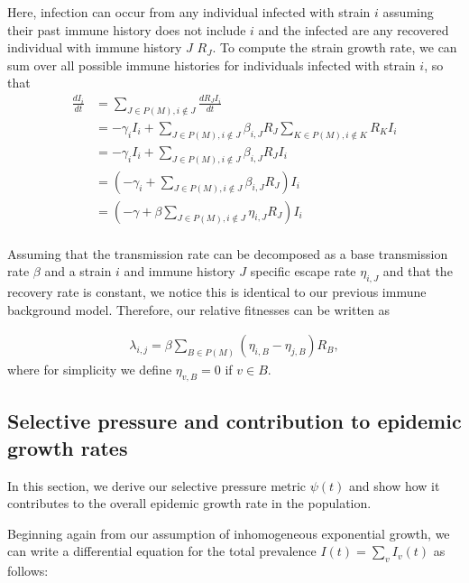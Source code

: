 \documentclass[11pt,oneside,letterpaper]{article}
\newcommand{\varEscape}{\eta}
\begin{document}
Here, infection can occur from any individual infected with strain $i$ assuming their past immune history does not include $i$ and the infected are any recovered individual with immune history $J$  $R_{J}$.
To compute the strain growth rate, we can sum over all possible immune histories for individuals infected with strain $i$, so that
\begin{align*}
    \frac{d I_{i}}{d t} &= \sum_{J \in P(M), i \notin J} \frac{dR_{J} I_{i}}{dt} \\
                        &= - \gamma_{i} I_{i} + \sum_{J \in P(M), i \notin J} \beta_{i, J} R_{J} \sum_{K \in P(M), i\notin K} R_{K}I_{i}\\
                        &= - \gamma_{i} I_{i} + \sum_{J \in P(M), i \notin J} \beta_{i, J} R_{J} I_{i}\\
                        &= \left(-\gamma_{i} + \sum_{J \in P(M), i \notin J} \beta_{i,J} R_{J} \right) I_{i}\\
                        &= \left(-\gamma + \beta\sum_{J \in P(M), i \notin J} \varEscape_{i,J} R_{J} \right) I_{i}\\
\end{align*}

Assuming that the transmission rate can be decomposed as a base transmission rate $\beta$ and a strain $i$ and immune history $J$ specific escape rate $\varEscape_{i, J}$ and that the recovery rate is constant, we notice this is identical to our previous immune background model.
Therefore, our relative fitnesses can be written as

\begin{align*}
    \lambda_{i, j} = \beta \sum_{B \in P(M)} (\varEscape_{i, B} - \varEscape_{j, B}) R_{B},
\end{align*}
where for simplicity we define $\varEscape_{v, B} = 0$ if $v \in B$.

\subsection{Selective pressure and contribution to epidemic growth rates}\label{ssec:deriving_selective_pressure}

In this section, we derive our selective pressure metric $\psi(t)$ and show how it contributes to the overall epidemic growth rate in the population.

Beginning again from our assumption of inhomogeneous exponential growth, we can write a differential equation for the total prevalence $I(t)= \sum_{v} I_{v}(t)$ as follows:
\end{document}
